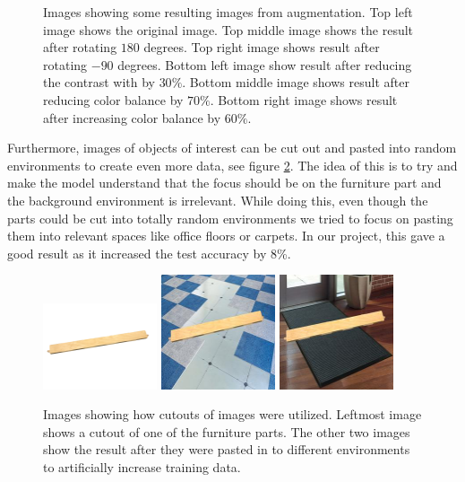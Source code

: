 \begin{figure}[hbtp]
\begin{center}
\caption{Images showing some resulting images from augmentation. Top left image shows the original image. Top middle image shows the result after rotating $180$ degrees. Top right image shows result after rotating $-90$ degrees. Bottom left image show result after  reducing the contrast with by $30\%$. Bottom middle image shows result after reducing color balance by $70\%$. Bottom right image shows result after increasing color balance by $60\%$.}
\label{fig:exampleArtificial}
\end{center}
\end{figure}

Furthermore, images of objects of interest can be cut out and pasted into random environments to create even more data, see figure \ref{fig:exampleCutout}.
The idea of this is to try and make the model understand that the focus should be on the furniture part and the background environment is irrelevant. While doing this, even though the parts could be cut into totally random environments we tried to focus on pasting them into relevant spaces like office floors or carpets.
In our project, this gave a good result as it increased the test accuracy by 8\%.

\begin{figure}[hbtp]
\begin{center}
\includegraphics[width = 0.3\textwidth]{./Images/image_13.jpg}
\includegraphics[width = 0.3\textwidth]{./Images/image_86.jpg}
\includegraphics[width = 0.3\textwidth]{./Images/image_107.jpg}
\caption{Images showing how cutouts of images were utilized. Leftmost image shows a cutout of one of the furniture parts. The other two images show the result after they were pasted in to different environments to artificially increase training data.}
\label{fig:exampleCutout}
\end{center}
\end{figure}


